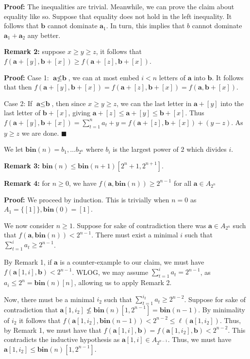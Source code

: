 \documentclass{article}
\begin{document}
\textbf{Proof:} The inequalities are trivial. Meanwhile, we can prove the claim about equality like so. Suppose that equality does not hold in the left inequality. It follows that $\textbf{b}$ cannot dominate $\textbf{a}_1$. In turn, this implies that $b$ cannot dominate $\textbf{a}_1 +\textbf{a}_2$ any better. 

\textbf{Remark 2:} suppose $x\ge y\ge z$, it follows that $f(\textbf{a}+[y],\textbf{b}+[x]) \ge f(\textbf{a}+[z],\textbf{b}+[x])$.

\textbf{Proof:} Case 1: $\textbf{a} \not \le \textbf{b}$, we can at most embed $i<n$ letters of $\textbf{a}$ into $\textbf{b}$. It follows that then $f(\textbf{a}+[y],\textbf{b}+[x])  =f(\textbf{a}+[z],\textbf{b}+[x])  = f(\textbf{a},\textbf{b}+[x])$. 

Case 2: If $\textbf{a}\le \textbf{b}$, then since $x \ge y\ge z$, we can the last letter in $\textbf{a}+[y]$ into the last letter of $\textbf{b}+[x]$, giving $\textbf{a}+[z]\le \textbf{a}+[y]\le \textbf{b}+[x]$. Thus $f(\textbf{a}+[y],\textbf{b}+[x]) = \sum_{t=1}^n a_t +y = f(\textbf{a}+[z],\textbf{b}+[x]) +(y-z)$. As $y \ge z$ we are done. $\blacksquare$


We let $\textbf{bin}(n) = b_1,\dots b_{2^n}$ where $b_i$ is the largest power of $2$ which divides $i$.



\textbf{Remark 3:} $\textbf{bin}(n)\le \textbf{bin}(n+1)[2^n+1,2^{n+1}]$.



\textbf{Remark 4:} for $n \ge 0$, we have $f(\textbf{a},\textbf{bin}(n))\ge 2^{n-1} $ for all $\textbf{a} \in A_{2^{n}}$

\textbf{Proof:} We proceed by induction. This is trivially  when $n = 0$ as $A_1 = \{[1]\},\textbf{bin}(0) = [1]$.

We now consider $n \ge 1$. Suppose for sake of contradiction there was $\textbf{a} \in A_{2^n}$ such that $f(\textbf{a},\textbf{bin}(n))<2^{n-1}$. There must exist a minimal $i$ such that $\sum_{t=1}^{i} a_t \ge 2^{n-1}$. 

By Remark 1, if $\textbf{a}$ is a counter-example to our claim, we must have $f(\textbf{a}[1,i],\textbf{b})<2^{n-1}$. WLOG, we may assume $\sum_{t=1}^i a_t = 2^{n-1}$, as $a_i \le 2^n = \textbf{bin}(n)[n]$, allowing us to apply Remark 2.

Now, there must be a minimal $i_2$ such that $\sum_{t=1}^{i_2} a_t \ge 2^{n-2}$. Suppose for sake of contradiction that $\textbf{a}[1,i_2] \not\le \textbf{bin}(n)[1,2^{n-1}] = \textbf{bin}(n-1)$. By minimality of $i_2$ it follows that $f(\textbf{a}[1,i_2],\textbf{bin}(n-1)) < 2^{n-2}\le \ell(\textbf{a}[1,i_2])$. Thus, by Remark 1, we must have that $f(\textbf{a}[1,i],\textbf{b}) = f(\textbf{a}[1,i_2],\textbf{b})<2^{n-2}$. This contradicts the inductive hypothesis as $\textbf{a}[1,i] \in A_{2^{n-1}}$. Thus, we must have $\textbf{a}[1,i_2]\le \textbf{bin}(n)[1,2^{n-1}]$.
\end{document}
